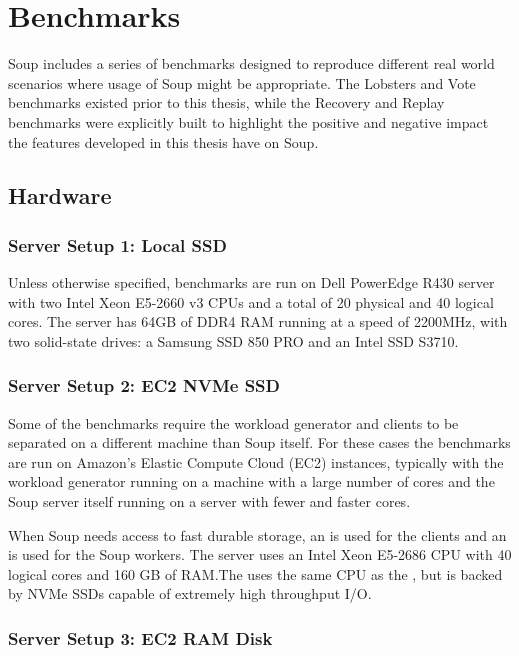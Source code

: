 \chapter{Benchmarks}\label{chap:benchmarks}

Soup includes a series of benchmarks designed to reproduce different real world
scenarios where usage of Soup might be appropriate. The Lobsters and Vote
benchmarks existed prior to this thesis, while the Recovery and Replay
benchmarks were explicitly built to highlight the positive and negative impact
the features developed in this thesis have on Soup.

\section{Hardware}

\subsection{Server Setup 1: Local SSD}

Unless otherwise specified, benchmarks are run on Dell PowerEdge R430 server
with two Intel Xeon E5-2660 v3 CPUs and a total of 20 physical and 40 logical
cores. The server has 64GB of DDR4 RAM running at a speed of 2200MHz, with two
solid-state drives: a Samsung SSD 850 PRO and an Intel SSD S3710.

\subsection{Server Setup 2: EC2 NVMe SSD}

Some of the benchmarks require the workload generator and clients to be
separated on a different machine than Soup itself. For these cases the
benchmarks are run on Amazon's Elastic Compute Cloud (EC2)
instances, typically with the
workload generator running on a machine with a large number of cores and the
Soup server itself running on a server with fewer and faster cores.

When Soup needs access to fast durable storage, an  is used
for the clients and an  is used for the Soup workers. The
 server uses an Intel Xeon E5-2686 CPU with 40 logical cores
and 160 GB of RAM.\@ The  uses the same CPU as the ,
but is backed by NVMe SSDs capable of extremely high throughput I/O.

\subsection{Server Setup 3: EC2 RAM Disk}

